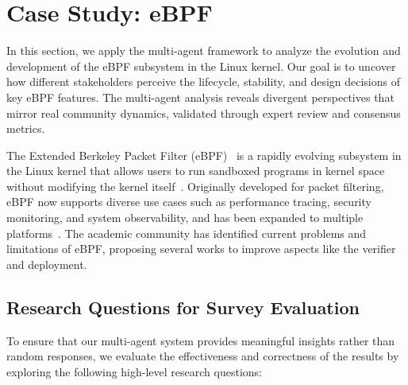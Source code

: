 \section{Case Study: eBPF}
\label{sec:analysis}

In this section, we apply the \sys multi-agent framework to analyze the evolution and development of the eBPF subsystem in the Linux kernel. Our goal is to uncover how different stakeholders perceive the lifecycle, stability, and design decisions of key eBPF features. The multi-agent analysis reveals divergent perspectives that mirror real community dynamics, validated through expert review and consensus metrics.

The Extended Berkeley Packet Filter (eBPF)~\cite{ebpf} is a rapidly evolving subsystem in the Linux kernel that allows users to run sandboxed programs in kernel space without modifying the kernel itself~\cite{lim2024safebpf}. Originally developed for packet filtering, eBPF now supports diverse use cases such as performance tracing, security monitoring, and system observability, and has been expanded to multiple platforms~\cite{windows-ebpf,zheng2023bpftime}. The academic community has identified current problems and limitations of eBPF, proposing several works to improve aspects like the verifier and deployment.

\subsection{Research Questions for Survey Evaluation}

To ensure that our multi-agent system provides meaningful insights rather than random responses, we evaluate the effectiveness and correctness of the \sys results by exploring the following high-level research questions:

